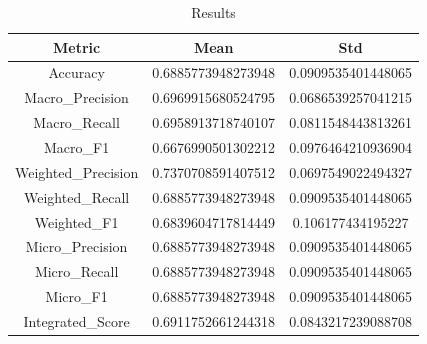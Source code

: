 \begin{table}[htbp]
\centering
\caption{Results}
\label{tab:csv}
\small
\setlength{\tabcolsep}{4pt}
\begin{tabular}{|c|c|c|}
\hline
Metric & Mean & Std \\
\hline
Accuracy & 0.6885773948273948 & 0.0909535401448065 \\
Macro_Precision & 0.6969915680524795 & 0.0686539257041215 \\
Macro_Recall & 0.6958913718740107 & 0.0811548443813261 \\
Macro_F1 & 0.6676990501302212 & 0.0976464210936904 \\
Weighted_Precision & 0.7370708591407512 & 0.0697549022494327 \\
Weighted_Recall & 0.6885773948273948 & 0.0909535401448065 \\
Weighted_F1 & 0.6839604717814449 & 0.106177434195227 \\
Micro_Precision & 0.6885773948273948 & 0.0909535401448065 \\
Micro_Recall & 0.6885773948273948 & 0.0909535401448065 \\
Micro_F1 & 0.6885773948273948 & 0.0909535401448065 \\
Integrated_Score & 0.6911752661244318 & 0.0843217239088708 \\
\hline
\end{tabular}
\end{table}